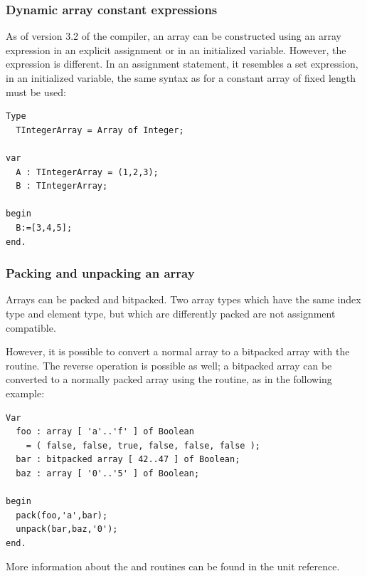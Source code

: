 \subsubsection{Dynamic array constant expressions}
As of version 3.2 of the compiler, an array can be constructed using an
array expression in an explicit assignment or in an initialized variable.
However, the expression is different. In an assignment statement, it
resembles a set expression, in an initialized variable, the same syntax as
for a constant array of fixed length must be used:
\begin{verbatim}
Type
  TIntegerArray = Array of Integer;

var
  A : TIntegerArray = (1,2,3);
  B : TIntegerArray;

begin
  B:=[3,4,5];
end.
\end{verbatim}


\subsubsection{Packing and unpacking an array}
Arrays can be packed and bitpacked. Two array types which have the same index
type and element type, but which are differently packed are not assignment
compatible.

However, it is possible to convert a normal array to a bitpacked array with the
 routine. The reverse operation is possible as well; a bitpacked
array can be converted to a normally packed array using the 
routine, as in the following example:
\begin{verbatim}
Var
  foo : array [ 'a'..'f' ] of Boolean
    = ( false, false, true, false, false, false );
  bar : bitpacked array [ 42..47 ] of Boolean;
  baz : array [ '0'..'5' ] of Boolean;

begin
  pack(foo,'a',bar);
  unpack(bar,baz,'0');
end.
\end{verbatim}
More information about the  and  routines can be found in the
 unit reference.

%
